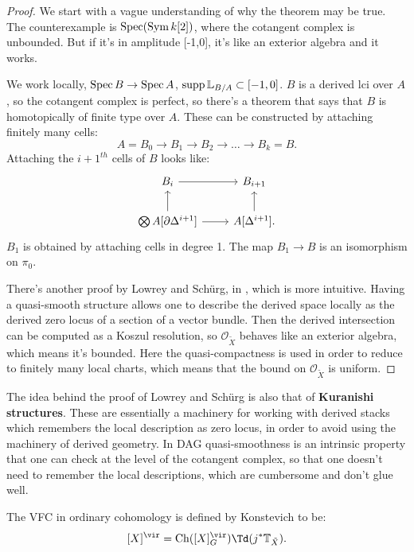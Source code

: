 \begin{proof}
We start with a vague understanding of why the theorem may be true. The counterexample is $\operatorname{Spec} (\operatorname{Sym} k[2])$, 
where the cotangent complex is unbounded. But if it's in amplitude [-1,0], it's like an exterior algebra and it works.

We work locally, $\operatorname{Spec} B \to \operatorname{Spec} A$, $\operatorname{supp} \mathbb L_{B/A} \subset[-1,0]$. $B$ is a derived lci over $A$, so the cotangent complex
is perfect, so there's a theorem that says that $B$ is homotopically of finite type over $A$. These can be constructed by attaching
finitely many cells:
\[	A = B_0 \to B_1 \to B_2 \to \dots \to B_k = B.	\]
Attaching the $i+1^{th}$ cells of $B$ looks like:
\[
\begin{tikzcd}
B_i \arrow{r} & B_{i+1} \\
\bigotimes A[\p \Delta^{i+1}]\arrow{u}\arrow{r} & A[\Delta^{i+1}]\arrow{u} .
\end{tikzcd}
\]
$B_1$ is obtained by attaching cells in degree 1. The map $B_1 \to B$ is an isomorphism on $\pi_0$. 

There's another proof by Lowrey and Sch\"urg, in \cite{derived_GRR}, which is more intuitive. Having a quasi-smooth structure 
allows one to describe
the derived space locally as the derived zero locus of a section of a vector bundle. Then the derived intersection can be computed
as a Koszul resolution, so $\mathcal{O}_{\tilde X}$ behaves like an exterior algebra, which means it's bounded. Here the quasi-compactness
is used in order to reduce to finitely many local charts, which means that the bound on $\mathcal{O}_{\tilde X}$ is uniform.
\end{proof}

\begin{rem}
The idea behind the proof of Lowrey and Sch\"urg is also that of
\textbf{Kuranishi structures}. These are essentially a machinery for working with derived stacks which remembers the 
local description as zero locus, in order to avoid using the machinery of derived geometry.
In DAG quasi-smoothness is an intrinsic property that one can check at the level of the cotangent complex, so that one doesn't
need to remember the local descriptions, which are cumbersome and don't glue well.
\end{rem}

The VFC in ordinary cohomology is defined by Konstevich to be:
\begin{equation}
\label{eq:G_definition_VFC}
	[X]^{\vir} = \Ch([X]_G^{\vir}) \Td(j^* \bbT_{\tilde X}).
\end{equation}

